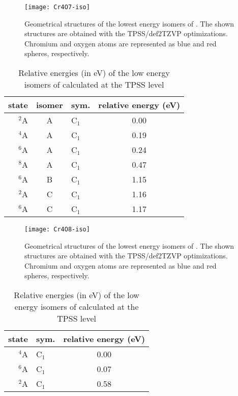 \clearpage


\begin{figure}
	\centering
	\texttt{[image: Cr4O7-iso]}
	\caption{Geometrical structures of the lowest energy isomers of . The shown structures are obtained with the TPSS/def2TZVP optimizations. Chromium and oxygen atoms are represented as blue and red spheres, respectively.}
	\label{figs:Cr4O7}
\end{figure}




\begin{table}[]
	\centering
	\caption{Relative energies (in eV) of the low energy isomers of  calculated at the TPSS level}
	\begin{tabular}{@{}rclc@{}}
	\toprule
	state 	 & isomer & sym. 	& relative energy (eV) \\ \midrule
	$^2$A    & A      & C$_1$   & 0.00                 \\
	$^4$A    & A      & C$_1$   & 0.19                 \\
	$^6$A    & A      & C$_1$   & 0.24                 \\
	$^8$A    & A      & C$_1$   & 0.47                 \\
	$^6$A    & B      & C$_1$   & 1.15                 \\
	$^2$A    & C      & C$_1$   & 1.16                 \\
	$^6$A    & C      & C$_1$   & 1.17                 \\ \bottomrule
	\end{tabular}
\end{table}


\begin{figure}
	\centering
	\texttt{[image: Cr4O8-iso]}
	\caption{Geometrical structures of the lowest energy isomers of . The shown structures are obtained with the TPSS/def2TZVP optimizations. Chromium and oxygen atoms are represented as blue and red spheres, respectively.}
	\label{figs:Cr4O8}
\end{figure}




\FloatBarrier



\begin{table}[]
	\centering
	\caption{Relative energies (in eV) of the low energy isomers of  calculated at the TPSS level}
	\begin{tabular}{@{}rlc@{}}
	\toprule
	state    & sym.    & relative energy (eV) \\ \midrule
	$^4$A    & C$_1$   & 0.00                 \\
	$^6$A    & C$_1$   & 0.07                 \\
	$^2$A    & C$_1$   & 0.58                 \\ \bottomrule
	\end{tabular}
\end{table}


